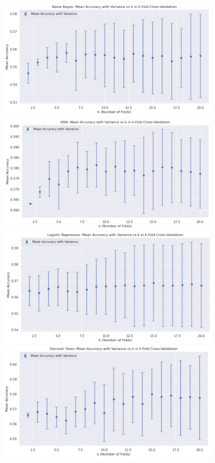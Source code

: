 \documentclass{article}
\begin{document}
\begin{figure}[htbp]
\centering
\begin{minipage}{1\textwidth}
  \centering
  \includegraphics[width=.6\linewidth]{Figures/NB_k.png}
\end{minipage}
\begin{minipage}{1\textwidth}
  \centering
  \includegraphics[width=.6\linewidth]{Figures/KNN_k.png}
\end{minipage}
\begin{minipage}{1\textwidth}
  \centering
  \includegraphics[width=.6\linewidth]{Figures/LR_k.png}
\end{minipage}
\begin{minipage}{1\textwidth}
  \centering
  \includegraphics[width=.6\linewidth]{Figures/DT_k.png}
\end{minipage}

\end{figure}
\end{document}
